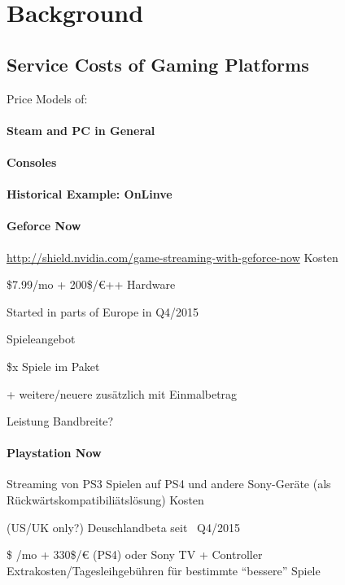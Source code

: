 \section{Background}



\subsection{Service Costs of Gaming Platforms}

Price Models of:

\paragraph{Steam and PC in General}

\paragraph{Consoles}

\paragraph{Historical Example: OnLinve}


\paragraph{Geforce Now}
\url{http://shield.nvidia.com/game-streaming-with-geforce-now}
Kosten

\$7.99/mo + 200\$/€++ Hardware

Started in parts of Europe in Q4/2015

Spieleangebot

\$x Spiele im Paket

 + weitere/neuere zusätzlich mit Einmalbetrag

Leistung
Bandbreite? 

\paragraph{Playstation Now}
Streaming von PS3 Spielen auf PS4 und andere Sony-Geräte (als Rückwärtskompatibiliätslösung)
Kosten

(US/UK only?) Deuschlandbeta seit ~Q4/2015

\$ /mo + 330\$/€ (PS4) oder Sony TV + Controller
Extrakosten/Tagesleihgebühren für bestimmte ``bessere'' Spiele





